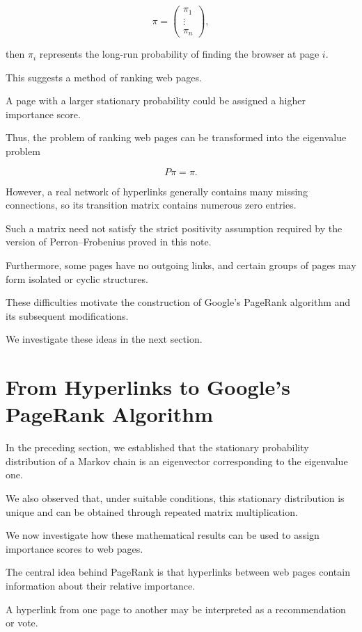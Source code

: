 \documentclass[11pt,a4paper]{article}
\theoremstyle{definition}
\theoremstyle{remark}
\begin{document}
\[
\pi=
\begin{pmatrix}
\pi_1\\
\vdots\\
\pi_n
\end{pmatrix},
\]

then $\pi_i$ represents
the long-run probability
of finding the browser
at page $i$.

This suggests a method
of ranking web pages.

A page with a larger
stationary probability
could be assigned a
higher importance score.

Thus, the problem
of ranking web pages
can be transformed into
the eigenvalue problem

\[
\boxed{P\pi=\pi.}
\]

However, a real network
of hyperlinks generally
contains many missing
connections, so its
transition matrix contains
numerous zero entries.

Such a matrix need not
satisfy the strict
positivity assumption
required by the version
of Perron--Frobenius
proved in this note.

Furthermore, some pages
have no outgoing links,
and certain groups of
pages may form isolated
or cyclic structures.

These difficulties
motivate the construction
of Google's PageRank
algorithm and its
subsequent modifications.

We investigate these
ideas in the next section.

\section{From Hyperlinks to Google's PageRank Algorithm}

In the preceding section, we established
that the stationary probability
distribution of a Markov chain
is an eigenvector corresponding
to the eigenvalue one.

We also observed that, under suitable
conditions, this stationary distribution
is unique and can be obtained through
repeated matrix multiplication.

We now investigate how these
mathematical results can be used
to assign importance scores
to web pages.

The central idea behind PageRank
is that hyperlinks between
web pages contain information
about their relative importance.

A hyperlink from one page
to another may be interpreted
as a recommendation or vote.
\end{document}
